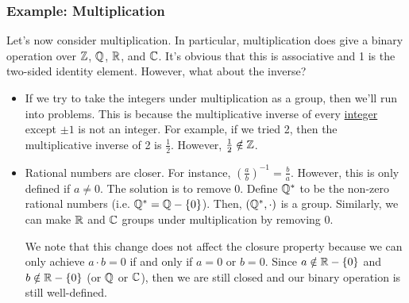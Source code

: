 \documentclass[letterpaper]{article}
\begin{document}
\subsubsection{Example: Multiplication}
Let's now consider multiplication. In particular, multiplication does give a binary operation over $\mathbb{Z}$, $\mathbb{Q}$, $\mathbb{R}$, and $\mathbb{C}$. It's obvious that this is associative and 1 is the two-sided identity element. However, what about the inverse? 
\begin{itemize}
    \item If we try to take the integers under multiplication as a group, then we'll run into problems. This is because the multiplicative inverse of every \underline{integer} except $\pm 1$ is not an integer. For example, if we tried 2, then the multiplicative inverse of 2 is $\frac{1}{2}$. However, $\frac{1}{2} \notin \mathbb{Z}$. 
    
    \item Rational numbers are closer. For instance, $\left(\frac{a}{b}\right)^{-1} = \frac{b}{a}$. However, this is only defined if $a \neq 0$. The solution is to remove 0. Define $\mathbb{Q}^*$ to be the non-zero rational numbers (i.e. $\mathbb{Q}^* = \mathbb{Q} - \{0\}$). Then, $(\mathbb{Q}^*, \cdot)$ is a group. Similarly, we can make $\mathbb{R}$ and $\mathbb{C}$ groups under multiplication by removing 0. 
    
    \bigskip 

    We note that this change does not affect the closure property because we can only achieve $a \cdot b = 0$ if and only if $a = 0$ or $b = 0$. Since $a \notin \mathbb{R} - \{0\}$ and $b \notin \mathbb{R} - \{0\}$ (or $\mathbb{Q}$ or $\mathbb{C}$), then we are still closed and our binary operation is still well-defined. 
\end{itemize}
\end{document}
